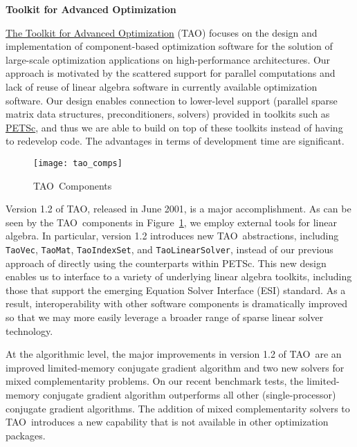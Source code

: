\documentclass[11pt]{article}
\newcommand{\tao} {\mbox{\sf \footnotesize TAO}}
\begin{document}
\setlength{\baselineskip}{15pt}

\begin{center}
{\large
\textbf{Toolkit for Advanced Optimization}}
\end{center}

\href{https://petsc.org/}
{The Toolkit for Advanced Optimization} (\tao)
focuses on the design and implementation of
component-based optimization software for the
solution of large-scale optimization applications
on high-performance architectures.
Our approach is motivated by the
scattered support for parallel computations and
lack of reuse of linear algebra software in
currently available optimization software.
Our design enables connection to lower-level
support (parallel sparse matrix data
structures, preconditioners, solvers) provided in toolkits such as
\href{https://petsc.org/}{PETSc},
and thus we are able to build on top of these toolkits
instead of having to redevelop code. The advantages in
terms of development time are significant.

\begin{figure}[h]
\centerline {\texttt{[image: tao\_comps]}}
\caption{\tao\ Components}
\label{figure:tao_comps}
\end{figure}

Version 1.2 of \tao, released in June 2001, is a major accomplishment.
As can be seen by the \tao\ components in
Figure~\ref{figure:tao_comps}, we employ external tools for linear
algebra.  In particular, version 1.2 introduces new \tao\
abstractions, including \texttt{TaoVec}, \texttt{TaoMat},
\texttt{TaoIndexSet}, and \texttt{TaoLinearSolver}, instead of our
previous approach of directly using the counterparts within PETSc.
This new design enables us to interface to a variety of underlying
linear algebra toolkits, including those that support the emerging
Equation Solver Interface (ESI) standard.  As a result,
interoperability with other software components is dramatically
improved so that we may more easily leverage a broader range of
sparse linear solver technology.

\clearpage

At the algorithmic level, the major improvements in version 1.2 of \tao\
are  an improved limited-memory conjugate gradient algorithm
and two new solvers for mixed  complementarity problems.
On our recent benchmark tests, the 
limited-memory conjugate gradient algorithm outperforms all
other (single-processor) conjugate gradient algorithms.
The addition of mixed complementarity solvers to \tao\
introduces a new capability that is not available in other
optimization packages.
\end{document}
